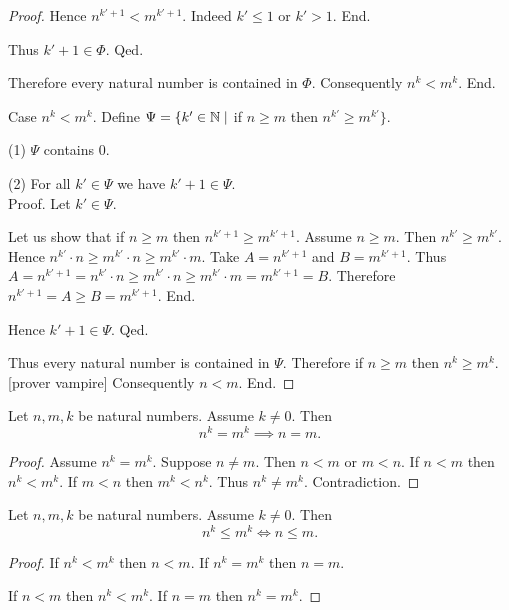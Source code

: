 \documentclass[10pt]{article}
\begin{document}
\begin{forthel}
\begin{proof}
            Hence $n^{k' + 1} < m^{k' + 1}$.
            Indeed $k' \leq 1$ or $k' > 1$.
          End.

          Thus $k' + 1 \in \Phi$.
        Qed.

        Therefore every natural number is contained in $\Phi$.
        Consequently $n^{k} < m^{k}$.
      End.

      Case $n^{k} < m^{k}$.
        Define $\Psi = \{ k' \in \mathbb{N} \mid$ if $n \geq m$ then
        $n^{k'} \geq m^{k'} \}$.

        (1) $\Psi$ contains $0$.

        (2) For all $k' \in \Psi$ we have $k' + 1 \in \Psi$. \\
        Proof.
          Let $k' \in \Psi$.

          Let us show that if $n \geq m$ then $n^{k' + 1} \geq m^{k' + 1}$.
            Assume $n \geq m$.
            Then $n^{k'} \geq m^{k'}$.
            Hence $n^{k'} \cdot n \geq m^{k'} \cdot n \geq m^{k'} \cdot m$.
            Take $A = n^{k' + 1}$ and $B = m^{k' + 1}$. %
            Thus $A
              = n^{k' + 1}
              = n^{k'} \cdot n
              \geq m^{k'} \cdot n
              \geq m^{k'} \cdot m
              = m^{k' + 1}
              = B$.
            Therefore $n^{k' + 1} = A \geq B = m^{k' + 1}$.
          End.

          Hence $k' + 1 \in \Psi$.
        Qed.

        Thus every natural number is contained in $\Psi$.
        Therefore if $n \geq m$ then $n^{k} \geq m^{k}$.
        [prover vampire]
        Consequently $n < m$.
      End.
    \end{proof}
  \end{forthel}

  \begin{forthel}
    \begin{corollary}
      Let $n, m, k$ be natural numbers.
      Assume $k \neq 0$.
      Then \[ n^{k} = m^{k} \implies n = m. \]
    \end{corollary}
    \begin{proof}
      Assume $n^{k} = m^{k}$.
      Suppose $n \neq m$.
      Then $n < m$ or $m < n$.
      If $n < m$ then $n^{k} < m^{k}$.
      If $m < n$ then $m^{k} < n^{k}$.
      Thus $n^{k} \neq m^{k}$.
      Contradiction.
    \end{proof}
  \end{forthel}

  \begin{forthel}
    \begin{corollary}
      Let $n, m, k$ be natural numbers.
      Assume $k \neq 0$.
      Then \[ n^{k} \leq m^{k} \iff n \leq m. \]
    \end{corollary}
    \begin{proof}
      If $n^{k} < m^{k}$ then $n < m$.
      If $n^{k} = m^{k}$ then $n = m$.

      If $n < m$ then $n^{k} < m^{k}$.
      If $n = m$ then $n^{k} = m^{k}$.
    \end{proof}
  \end{forthel}
\end{document}

